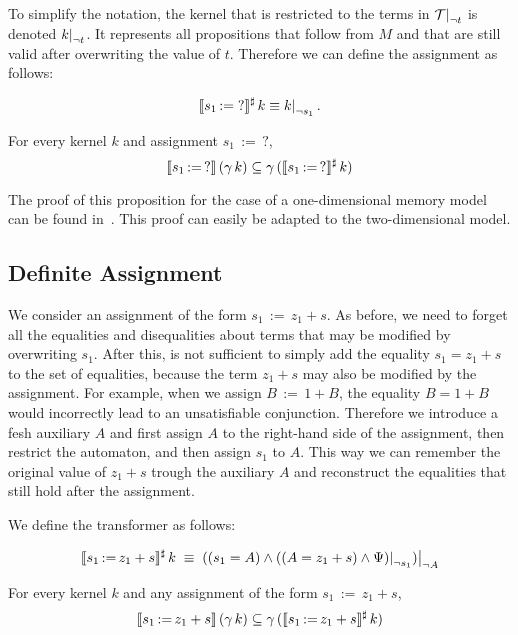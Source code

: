 To simplify the notation, the kernel that is restricted to the terms in $\restr{\T}{\neg t}$ is denoted $\restr{k}{\neg t}$.
It represents all propositions that follow from $M$ and that are still valid after overwriting the value of $t$.
Therefore we can define the assignment as follows:

\[
	\sem{s_1\,{:=}\;?}^\sharp\,k \equiv \restr{k}{\neg s_1}.
\]

\begin{proposition}\label{p:ass-unknown}
	For every kernel $k$ and assignment $s_1\,{:=}\,?$,
	\[
		\llbracket s_1\,{:=}\,?\rrbracket\,(\gamma\,k) \subseteq \gamma\,(\llbracket s_1\,{:=}\,?\rrbracket^\sharp\,k)
	\]
\end{proposition}

The proof of this proposition for the case of a one-dimensional memory model can be found in~\cite{2pointer}.
This proof can easily be adapted to the two-dimensional model.

\subsection{Definite Assignment}

We consider an assignment of the form $s_1\,{:=}\,z_1+s$.
As before, we need to forget all the equalities and disequalities about terms that may be modified by overwriting $s_1$.
After this, is not sufficient to simply add the equality $s_1 = z_1+s$ to the set of equalities,
because the term $z_1 + s$ may also be modified by the assignment. For example, when we assign $B\,{:=}\,1+B$, the equality $B = 1 + B$ would incorrectly lead to an unsatisfiable conjunction.
Therefore we introduce a fesh auxiliary $A$ and first assign $A$ to the right-hand side of the assignment, then restrict the automaton, and then assign $s_1$ to $A$.
This way we can remember the original value of $z_1 + s$ trough the auxiliary $A$ and reconstruct the equalities that still hold after the assignment.

We define the transformer as follows:

\[
	\sem{s_1\,{:=}\,z_1+s}^\sharp\,k\;\equiv\;
	\restr{((s_1=A)\land\restr{((A=z_1+s)\land\Psi)}{\neg s_1})}{\neg A}
\]

\begin{proposition}\label{p:ass-definite}
	For every kernel $k$ and any assignment of the form $s_1\,{:=}\,z_1+s$,
	\[
		\llbracket s_1\,{:=}\,z_1+s\rrbracket\,(\gamma\,k) \subseteq \gamma\,(\llbracket s_1\,{:=}\,z_1+s\rrbracket^\sharp\,k)
	\]
\end{proposition}

